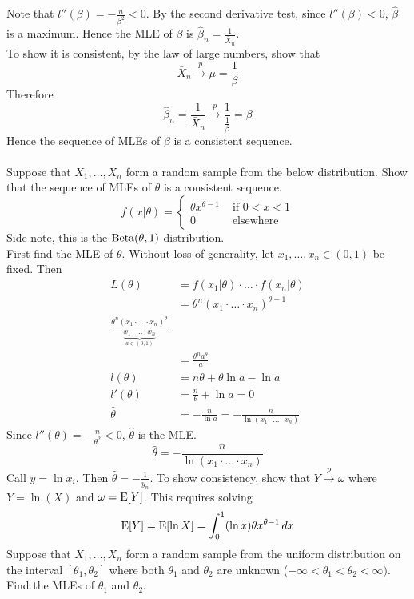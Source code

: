 \documentclass[12pt]{article}
\begin{document}
Note that $l''(\beta) = -\frac{n}{\beta^2} < 0$. By the second derivative test, since $l''(\beta) < 0$, $\hat{\beta}$ is a maximum. Hence the MLE of $\beta$ is $\hat{\beta}_n = \frac{1}{\bar{X}_n}$. \\ To show it is consistent, by the law of large numbers, show that $$\bar{X}_n \stackrel{p}{\to} \mu = \frac{1}{\beta} $$ Therefore $$\hat{\beta}_n = \frac{1}{\bar{X}_n} \stackrel{p}{\to} \frac{1}{\frac{1}{\beta}} = \beta $$ 
Hence the sequence of MLEs of $\beta$ is a consistent sequence. \\~\\
Suppose that $X_1,\dots,X_n$ form a random sample from the below distribution. Show that the sequence of MLEs of $\theta$ is a consistent sequence. 
$$f(x|\theta) = \begin{cases} \theta x^{\theta-1} &\text{ if } 0 < x < 1 \\ 0 &\text{ elsewhere } \end{cases} $$ 
Side note, this is the $\text{Beta}( \theta,1 )$ distribution. \\ 
First find the MLE of $\theta$. Without loss of generality, let $x_1,\dots,x_n \in (0,1)$ be fixed. Then $$ \begin{aligned} L(\theta) &= f(x_1|\theta) \cdot \dots \cdot f(x_n|\theta) \\ &= \theta^n(x_1\cdot \dots \cdot x_n)^{\theta-1} \\ \frac{\theta^n(x_1\cdot \dots \cdot x_n)^\theta}{\underbrace{x_1 \cdot \dots \cdot x_n}_{a \in (0,1)}} \\ &= \frac{\theta^n a^\theta}{a} \\ l(\theta) &= n\theta + \theta \ln a - \ln a \\ l'(\theta) &= \frac{n}{\theta} + \ln a = 0 \\ \hat{\theta} &= -\frac{n}{\ln a} = -\frac{n}{\ln (x_1 \cdot \dots \cdot x_n)} \end{aligned} $$
Since $l''(\theta) = -\frac{n}{\theta^2} < 0$, $\hat{\theta}$ is the MLE. $$\hat{\theta} = -\frac{n}{\ln(x_1 \cdot \dots \cdot x_n)} $$ Call $y = \ln x_i$. Then $\hat{\theta} = -\frac{1}{\bar{y}_n}$. To show consistency, show that $\bar{Y} \stackrel{p}{\to} \omega$ where $Y = \ln(X)$ and $\omega = \mathrm{E}[ Y ]$. This requires solving $$\mathrm{E}[ Y ] = \mathrm{E}[ \ln X ] = \int_0^1 (\ln x) \theta x^{\theta-1} \, dx $$ 
Suppose that $X_1,\dots,X_n$ form a random sample from the uniform distribution on the interval $[\theta_1,\theta_2]$ where both $\theta_1$ and $\theta_2$ are unknown ($-\infty < \theta_1 < \theta_2 < \infty)$. Find the MLEs of $\theta_1$ and $\theta_2$. \\
\end{document}
